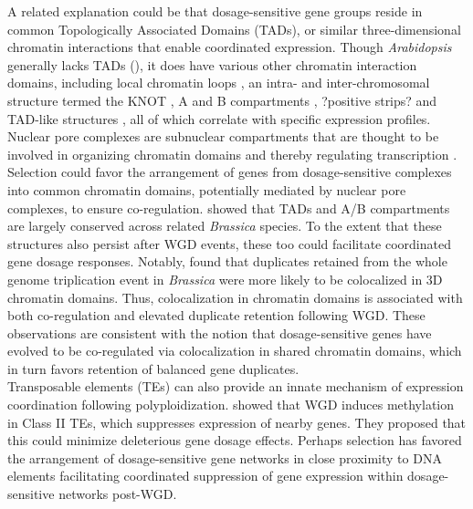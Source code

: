 \documentclass[11pt]{article}
\begin{document}
A related explanation could be that dosage-sensitive gene groups reside in common Topologically Associated Domains (TADs), or similar three-dimensional chromatin interactions that enable coordinated expression.
Though \textit{Arabidopsis} generally lacks TADs (\citep{liu2017}), it does have various other chromatin interaction domains, including local chromatin loops \citep{liu2017}, an intra- and inter-chromosomal structure termed the KNOT \citep{grob2014, grob2017}, A and B compartments \citep{grob2014}, ?positive strips? and TAD-like structures \citep{wang2015}, all of which  correlate with specific expression profiles.
Nuclear pore complexes are subnuclear compartments that are thought to be involved in organizing chromatin domains and thereby regulating transcription \citep{sun2019}.
Selection could favor the arrangement of genes from dosage-sensitive complexes into common chromatin domains, potentially mediated by nuclear pore complexes, to ensure co-regulation.
\cite{xie2019} showed that TADs and A/B compartments are largely conserved across related \textit{Brassica} species.
To the extent that these structures also persist after WGD events, these too could facilitate coordinated gene dosage responses.
Notably, \cite{xie2019} found that duplicates retained from the whole genome triplication event in \textit{Brassica} were more likely to be colocalized in 3D chromatin domains.
Thus, colocalization in chromatin domains is associated with both co-regulation and elevated duplicate retention following WGD.
These observations are consistent with the notion that dosage-sensitive genes have evolved to be co-regulated via colocalization in shared chromatin domains, which in turn favors retention of balanced gene duplicates.\\

Transposable elements (TEs) can also provide an innate mechanism of expression coordination following polyploidization.
\citep{zhang2015} showed that WGD induces methylation in Class II TEs, which suppresses expression of nearby genes.
They proposed that this could minimize deleterious gene dosage effects.
Perhaps selection has favored the arrangement of dosage-sensitive gene networks in close proximity to DNA elements facilitating coordinated suppression of gene expression within dosage-sensitive networks post-WGD.\\
\end{document}
